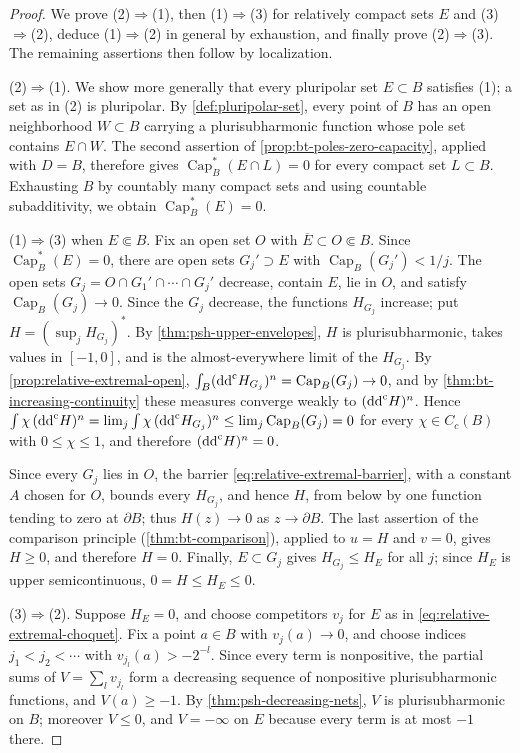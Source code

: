 \begin{proof}
We prove (2)$\Rightarrow$(1), then (1)$\Rightarrow$(3) for relatively compact sets $E$ and (3)$\Rightarrow$(2), deduce (1)$\Rightarrow$(2) in general by exhaustion, and finally prove (2)$\Rightarrow$(3). The remaining assertions then follow by localization.

(2)$\Rightarrow$(1). We show more generally that every pluripolar set $E\subset B$ satisfies (1); a set as in (2) is pluripolar. By \cref{def:pluripolar-set}, every point of $B$ has an open neighborhood $W\subset B$ carrying a plurisubharmonic function whose pole set contains $E\cap W$. The second assertion of \cref{prop:bt-poles-zero-capacity}, applied with $D=B$, therefore gives $\operatorname{Cap}_B^*(E\cap L)=0$ for every compact set $L\subset B$. Exhausting $B$ by countably many compact sets and using countable subadditivity, we obtain $\operatorname{Cap}_B^*(E)=0$.

(1)$\Rightarrow$(3) when $E\Subset B$. Fix an open set $O$ with $\overline E\subset O\Subset B$. Since $\operatorname{Cap}_B^*(E)=0$, there are open sets $G_j'\supset E$ with $\operatorname{Cap}_B(G_j')<1/j$. The open sets $G_j=O\cap G_1'\cap\cdots\cap G_j'$ decrease, contain $E$, lie in $O$, and satisfy $\operatorname{Cap}_B(G_j)\to0$. Since the $G_j$ decrease, the functions $H_{G_j}$ increase; put $H=(\sup_jH_{G_j})^*$. By \cref{thm:psh-upper-envelopes}, $H$ is plurisubharmonic, takes values in $[-1,0]$, and is the almost-everywhere limit of the $H_{G_j}$. By \cref{prop:relative-extremal-open}, $\int_B(\mathrm{dd}^{\mathrm{c}} H_{G_j})^n=\operatorname{Cap}_B(G_j)\to0$, and by \cref{thm:bt-increasing-continuity} these measures converge weakly to $(\mathrm{dd}^{\mathrm{c}} H)^n$. Hence $\int\chi\,(\mathrm{dd}^{\mathrm{c}} H)^n=\lim_j\int\chi\,(\mathrm{dd}^{\mathrm{c}} H_{G_j})^n\le\lim_j\operatorname{Cap}_B(G_j)=0$ for every $\chi\in C_c(B)$ with $0\le\chi\le1$, and therefore $(\mathrm{dd}^{\mathrm{c}} H)^n=0$.

Since every $G_j$ lies in $O$, the barrier \eqref{eq:relative-extremal-barrier}, with a constant $A$ chosen for $O$, bounds every $H_{G_j}$, and hence $H$, from below by one function tending to zero at $\partial B$; thus $H(z)\to0$ as $z\to\partial B$. The last assertion of the comparison principle (\cref{thm:bt-comparison}), applied to $u=H$ and $v=0$, gives $H\ge0$, and therefore $H=0$. Finally, $E\subset G_j$ gives $H_{G_j}\le H_E$ for all $j$; since $H_E$ is upper semicontinuous, $0=H\le H_E\le0$.

(3)$\Rightarrow$(2). Suppose $H_E=0$, and choose competitors $v_j$ for $E$ as in \eqref{eq:relative-extremal-choquet}. Fix a point $a\in B$ with $v_j(a)\to0$, and choose indices $j_1<j_2<\cdots$ with $v_{j_l}(a)>-2^{-l}$. Since every term is nonpositive, the partial sums of $V=\sum_lv_{j_l}$ form a decreasing sequence of nonpositive plurisubharmonic functions, and $V(a)\ge-1$. By \cref{thm:psh-decreasing-nets}, $V$ is plurisubharmonic on $B$; moreover $V\le0$, and $V=-\infty$ on $E$ because every term is at most $-1$ there.


\end{proof}
